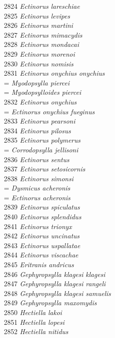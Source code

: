 \documentclass[
]{article}
\begin{document}
2824 \emph{Ectinorus lareschiae}\\
2825 \emph{Ectinorus levipes}\\
2826 \emph{Ectinorus martini}\\
2827 \emph{Ectinorus mimacydis}\\
2828 \emph{Ectinorus mondacai}\\
2829 \emph{Ectinorus morenoi}\\
2830 \emph{Ectinorus nomisis}\\
2831 \emph{Ectinorus onychius onychius}\\
= \emph{Myodopsylla piercei}\\
= \emph{Myodopsylloides piercei}\\
2832 \emph{Ectinorus onychius}\\
= \emph{Ectinorus onychius fueginus}\\
2833 \emph{Ectinorus pearsoni}\\
2834 \emph{Ectinorus pilosus}\\
2835 \emph{Ectinorus polymerus}\\
= \emph{Corrodopsylla jellisoni}\\
2836 \emph{Ectinorus sentus}\\
2837 \emph{Ectinorus setosicornis}\\
2838 \emph{Ectinorus simonsi}\\
= \emph{Dysmicus acheronis}\\
= \emph{Ectinorus acheronis}\\
2839 \emph{Ectinorus spiculatus}\\
2840 \emph{Ectinorus splendidus}\\
2841 \emph{Ectinorus trionyx}\\
2842 \emph{Ectinorus uncinatus}\\
2843 \emph{Ectinorus uspallatae}\\
2844 \emph{Ectinorus viscachae}\\
2845 \emph{Eritranis andricus}\\
2846 \emph{Gephyropsylla klagesi klagesi}\\
2847 \emph{Gephyropsylla klagesi rangeli}\\
2848 \emph{Gephyropsylla klagesi samuelis}\\
2849 \emph{Gephyropsylla maxomydis}\\
2850 \emph{Hectiella lakoi}\\
2851 \emph{Hectiella lopesi}\\
2852 \emph{Hectiella nitidus}\\
\end{document}

